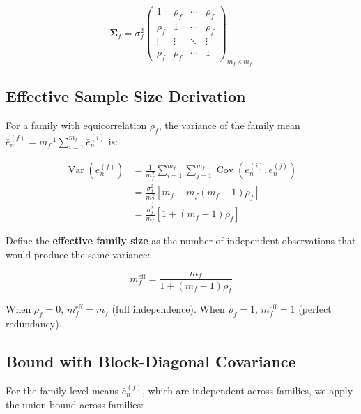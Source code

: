\documentclass[12pt,a4paper]{article}
\DeclareMathOperator{\Var}{Var}
\DeclareMathOperator{\Cov}{Cov}
\begin{document}
\begin{equation}
    \mathbf{\Sigma}_f = \sigma_f^2 \begin{pmatrix}
        1 & \rho_f & \cdots & \rho_f \\
        \rho_f & 1 & \cdots & \rho_f \\
        \vdots & \vdots & \ddots & \vdots \\
        \rho_f & \rho_f & \cdots & 1
    \end{pmatrix}_{m_f \times m_f} \label{eq:sigma_f}
\end{equation}

\subsection{Effective Sample Size Derivation}

For a family with equicorrelation $\rho_f$, the variance of the
family mean $\bar{e}_n^{(f)} = m_f^{-1} \sum_{i=1}^{m_f}
\bar{e}_n^{(i)}$ is:

\begin{align}
    \Var\left(\bar{e}_n^{(f)}\right) &=
    \frac{1}{m_f^2} \sum_{i=1}^{m_f} \sum_{j=1}^{m_f}
    \Cov\left(\bar{e}_n^{(i)}, \bar{e}_n^{(j)}\right) \nonumber \\
    &= \frac{\sigma_f^2}{m_f^2} \left[m_f + m_f(m_f - 1)\rho_f\right]
       \nonumber \\
    &= \frac{\sigma_f^2}{m_f} \left[1 + (m_f - 1)\rho_f\right]
       \label{eq:var_family}
\end{align}

Define the \textbf{effective family size} as the number of independent
observations that would produce the same variance:

\begin{equation}
    m_f^{\text{eff}} = \frac{m_f}{1 + (m_f - 1)\rho_f}
    \label{eq:mfeff}
\end{equation}

When $\rho_f = 0$, $m_f^{\text{eff}} = m_f$ (full independence).
When $\rho_f = 1$, $m_f^{\text{eff}} = 1$ (perfect redundancy).

\subsection{Bound with Block-Diagonal Covariance}

For the family-level means $\bar{e}_n^{(f)}$, which are independent
across families, we apply the union bound across families:
\end{document}
